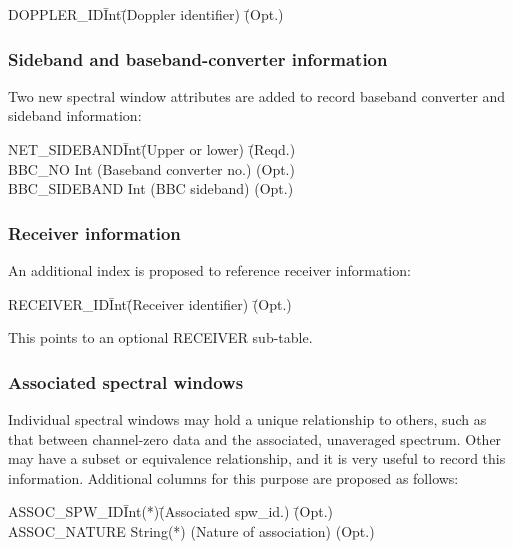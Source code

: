 \documentclass{article}
\begin{document}
\begin{tabbing}
DOPPLER\_ID\quad\quad \= Int\quad\quad \= 
(Doppler identifier) \quad\quad\quad\quad\quad \= (Opt.) \\
\end{tabbing}

\subsubsection{Sideband and baseband-converter information}

Two new spectral window attributes are added to record baseband
converter and sideband information:

\begin{tabbing}
NET\_SIDEBAND\quad\quad \= Int\quad\quad \= 
(Upper or lower) \quad\quad\quad\quad\quad \= (Reqd.) \\
BBC\_NO           \> Int  \> 
(Baseband converter no.) \> (Opt.) \\
BBC\_SIDEBAND     \> Int \>
(BBC sideband) \> (Opt.) \\
\end{tabbing}

\subsubsection{Receiver information}

An additional index is proposed to reference receiver information:

\begin{tabbing}
RECEIVER\_ID\quad\quad \= Int\quad\quad \= 
(Receiver identifier) \quad\quad\quad\quad\quad \= (Opt.) \\
\end{tabbing}

This points to an optional RECEIVER sub-table.

\subsubsection{Associated spectral windows}

Individual spectral windows may hold a unique relationship to others,
such as that between channel-zero data and the associated, unaveraged
spectrum. Other may have a subset or equivalence relationship, and it
is very useful to record this information. Additional columns for this
purpose are proposed as follows:

\begin{tabbing}
ASSOC\_SPW\_ID\quad\quad \= Int(*)\quad\quad \= 
(Associated spw\_id.) \quad\quad\quad\quad\quad \= (Opt.) \\
ASSOC\_NATURE           \> String(*)  \> 
(Nature of association) \> (Opt.) \\
\end{tabbing}
\end{document}
